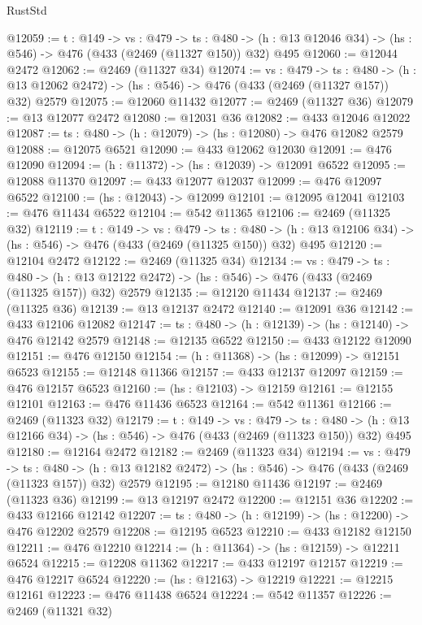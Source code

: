 \begin{lexlean}{RustStd}
\begin{coremodule}
@12059 := {t : @149} ->
  {vs : @479} ->
  {ts : @480} -> (h : @13 @12046 @34) -> (hs : @546) -> @476 (@433 (@2469 (@11327 @150)) @32) @495
@12060 := @12044 @2472
@12062 := @2469 (@11327 @34)
@12074 := {vs : @479} ->
  {ts : @480} ->
  (h : @13 @12062 @2472) -> (hs : @546) -> @476 (@433 (@2469 (@11327 @157)) @32) @2579
@12075 := @12060 @11432
@12077 := @2469 (@11327 @36)
@12079 := @13 @12077 @2472
@12080 := @12031 @36
@12082 := @433 @12046 @12022
@12087 := {ts : @480} -> (h : @12079) -> (hs : @12080) -> @476 @12082 @2579
@12088 := @12075 @6521
@12090 := @433 @12062 @12030
@12091 := @476 @12090
@12094 := (h : @11372) -> (hs : @12039) -> @12091 @6522
@12095 := @12088 @11370
@12097 := @433 @12077 @12037
@12099 := @476 @12097 @6522
@12100 := (hs : @12043) -> @12099
@12101 := @12095 @12041
@12103 := @476 @11434 @6522
@12104 := @542 @11365
@12106 := @2469 (@11325 @32)
@12119 := {t : @149} ->
  {vs : @479} ->
  {ts : @480} -> (h : @13 @12106 @34) -> (hs : @546) -> @476 (@433 (@2469 (@11325 @150)) @32) @495
@12120 := @12104 @2472
@12122 := @2469 (@11325 @34)
@12134 := {vs : @479} ->
  {ts : @480} ->
  (h : @13 @12122 @2472) -> (hs : @546) -> @476 (@433 (@2469 (@11325 @157)) @32) @2579
@12135 := @12120 @11434
@12137 := @2469 (@11325 @36)
@12139 := @13 @12137 @2472
@12140 := @12091 @36
@12142 := @433 @12106 @12082
@12147 := {ts : @480} -> (h : @12139) -> (hs : @12140) -> @476 @12142 @2579
@12148 := @12135 @6522
@12150 := @433 @12122 @12090
@12151 := @476 @12150
@12154 := (h : @11368) -> (hs : @12099) -> @12151 @6523
@12155 := @12148 @11366
@12157 := @433 @12137 @12097
@12159 := @476 @12157 @6523
@12160 := (hs : @12103) -> @12159
@12161 := @12155 @12101
@12163 := @476 @11436 @6523
@12164 := @542 @11361
@12166 := @2469 (@11323 @32)
@12179 := {t : @149} ->
  {vs : @479} ->
  {ts : @480} -> (h : @13 @12166 @34) -> (hs : @546) -> @476 (@433 (@2469 (@11323 @150)) @32) @495
@12180 := @12164 @2472
@12182 := @2469 (@11323 @34)
@12194 := {vs : @479} ->
  {ts : @480} ->
  (h : @13 @12182 @2472) -> (hs : @546) -> @476 (@433 (@2469 (@11323 @157)) @32) @2579
@12195 := @12180 @11436
@12197 := @2469 (@11323 @36)
@12199 := @13 @12197 @2472
@12200 := @12151 @36
@12202 := @433 @12166 @12142
@12207 := {ts : @480} -> (h : @12199) -> (hs : @12200) -> @476 @12202 @2579
@12208 := @12195 @6523
@12210 := @433 @12182 @12150
@12211 := @476 @12210
@12214 := (h : @11364) -> (hs : @12159) -> @12211 @6524
@12215 := @12208 @11362
@12217 := @433 @12197 @12157
@12219 := @476 @12217 @6524
@12220 := (hs : @12163) -> @12219
@12221 := @12215 @12161
@12223 := @476 @11438 @6524
@12224 := @542 @11357
@12226 := @2469 (@11321 @32)

\end{coremodule}
\end{lexlean}
